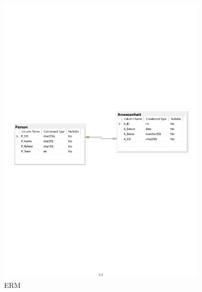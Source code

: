 \begin{figure}[htbp]
    \centering
    \includegraphics[width=0.9\textwidth,angle=0]{abb/ERM.pdf}
    \caption[Beschreibung]{ERM}
    \label{abb:ERM}
\end{figure}


